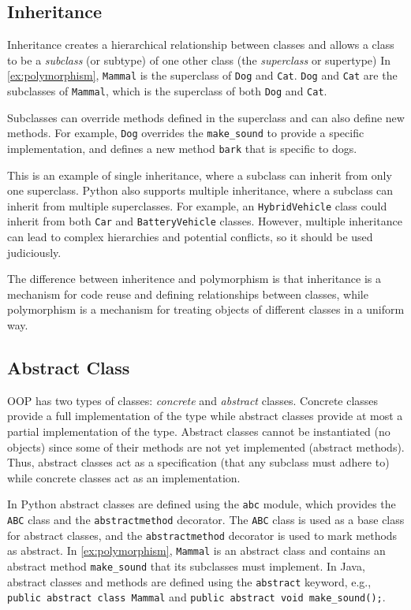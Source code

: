 \documentclass[oneside,11pt,dvipsnames]{book}
\newcommand{\code}[1]{\texttt{#1}}
\begin{document}
\subsection{Inheritance} 

Inheritance creates a hierarchical relationship between classes and allows a class to be a \emph{subclass} (or subtype) of one other class (the \emph{superclass} or supertype)
In \autoref{ex:polymorphism},
\code{Mammal} is the superclass of \code{Dog} and \code{Cat}.
\code{Dog} and \code{Cat} are the subclasses of \code{Mammal}, which is the superclass of both \code{Dog} and \code{Cat}.

Subclasses can override methods defined in the superclass and can also define new methods. For example, \code{Dog} overrides the
\code{make\_sound} to provide a specific implementation, and defines a new method \code{bark} that is specific to dogs.

This is an example of single inheritance, where a subclass can inherit from only one superclass. Python also supports multiple inheritance, where a subclass can inherit from multiple superclasses. For example, an \code{HybridVehicle} class could inherit from both \code{Car} and \code{BatteryVehicle} classes. However, multiple inheritance can lead to complex hierarchies and potential conflicts, so it should be used judiciously.

The difference between inheritence and polymorphism is that inheritance is a mechanism for code reuse and defining relationships between classes, while polymorphism is a mechanism for treating objects of different classes in a uniform way. 
\subsection{Abstract Class}
OOP has two types of classes: \emph{concrete} and \emph{abstract} classes. Concrete classes provide a full implementation of the type while abstract classes provide at most a partial implementation of the type. 
Abstract classes cannot be instantiated (no objects) since some of their methods are not yet implemented (abstract methods). 
Thus, abstract classes act as a specification (that any subclass must adhere to) while concrete classes act as an implementation.



In Python abstract classes are defined using the \code{abc} module, which provides the \code{ABC} class and the \code{abstractmethod} decorator. The \code{ABC} class is used as a base class for abstract classes, and the \code{abstractmethod} decorator is used to mark methods as abstract. In \autoref{ex:polymorphism},
\code{Mammal} is an abstract class and contains an abstract method \code{make\_sound} that its subclasses must implement.
In Java, abstract classes and methods are defined using the \code{abstract} keyword, e.g., \code{public abstract class Mammal} and \code{public abstract void make\_sound();}.
\end{document}
